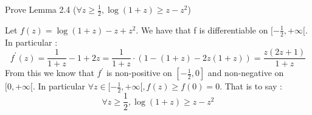 \begin{exercise}[]{}
	Prove Lemma 2.4 ($ \forall z \geq \frac{1}{2}, \log (1+z) \geq z - z^2 $)
\end{exercise}

\begin{solution}[]
	Let $ f(z) = \log (1+z) - z + z^2 $. We have that f is differentiable on $ [-\frac{1}{2},+\infty[ $. In particular :
\begin{equation*}
	f^{\prime}(z) = \frac{1}{1+z} - 1 + 2z = \frac{1}{1+z}\cdot (1 - (1+z) - 2z(1+z)) = \frac{z(2z+1)}{1+z} 
\end{equation*}
From this we know that $ f^{\prime} $ is non-positive on $ [-\frac{1}{2},0] $ and non-negative on $ [0,+\infty[ $. In particular $ \forall z\in [-\frac{1}{2}, +\infty[, f(z) \geq f(0)=0 $. That is to say :
\begin{equation*}
	\forall z \geq \frac{1}{2}, \log (1+z) \geq z - z^2
\end{equation*}
\end{solution}

